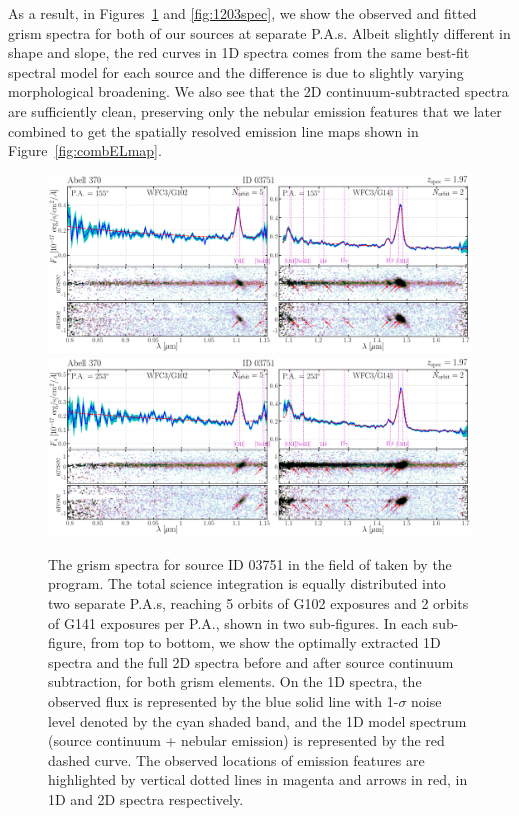 As a result, in Figures~\ref{fig:3751spec} and \ref{fig:1203spec}, we show the observed and fitted grism spectra 
for both of our sources at separate P.A.s.
Albeit slightly different in shape and slope, the red curves in 1D spectra comes from the same best-fit spectral 
model for each source and the difference is due to slightly varying morphological broadening.
We also see that the 2D continuum-subtracted spectra are sufficiently clean, preserving only the nebular emission
features that we later combined to get the spatially resolved emission line maps shown in 
Figure~\ref{fig:combELmap}.

\begin{figure}
    \includegraphics[width=\textwidth]{fig/clA370_id03751_pa155_ELfig.png}
    \includegraphics[width=\textwidth]{fig/clA370_id03751_pa253_ELfig.png}
    \caption[The \hst grism spectra for source ID 03751 in the field of \clsan taken by the \glass program.]
    {The \hst grism spectra for source ID 03751 in the field of \clsan taken by the \glass program.
    The total science integration is equally distributed into two separate P.A.s,
    reaching 5 orbits of G102 exposures and 2 orbits of G141 exposures per P.A., shown in two sub-figures.
    In each sub-figure, from top to bottom, we show the optimally extracted 1D spectra and the full 2D spectra 
    before and after source continuum subtraction, for both grism elements.
    On the 1D spectra, the observed flux is represented by the blue solid line with 1-$\sigma$ noise level 
    denoted by the cyan shaded band, and the 1D model spectrum (source continuum + nebular emission) is 
    represented by the red dashed curve.
    The observed locations of emission features are highlighted by vertical dotted lines in magenta and arrows in 
    red, in 1D and 2D spectra respectively.
    }
    \label{fig:3751spec}
\end{figure}


